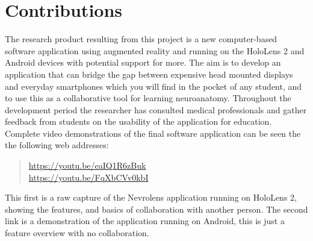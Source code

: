 
\section{Contributions}

The research product resulting from this project is a new computer-based software application using augmented reality and running on the HoloLens 2 and Android devices with potential support for more. The aim is to develop an application that can bridge the gap between expensive head mounted displays and everyday smartphones which you will find in the pocket of any student, and to use this as a collaborative tool for learning neuroanatomy. Throughout the development period the researcher has consulted medical professionals and gather feedback from students on the usability of the application for education.
\newline\newline
\noindent
Complete video demonstrations of the final software application can be seen the the following web addresses:
\begin{quote}
    \url{https://youtu.be/eaIQ1R6zBuk}\\
    \url{https://youtu.be/FqXbCVv0kbI}
\end{quote}
This first is a raw capture of the Nevrolens application running on HoloLens 2, showing the features, and basics of collaboration with another person. The second link is a demonstration of the application running on Android, this is just a feature overview with no collaboration.




